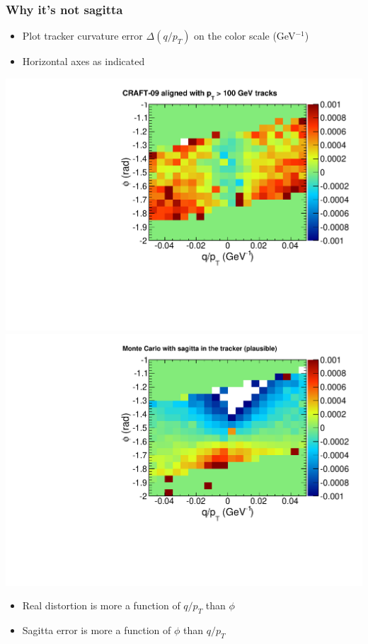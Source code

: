 \documentclass[compress]{beamer}
\begin{document}
\begin{frame}
\frametitle{Why it's not sagitta}

\begin{itemize}
\item Plot tracker curvature error $\Delta (q/p_T)$ on the color scale (GeV$^{-1}$)
\item Horizontal axes as indicated
\end{itemize}

\includegraphics[width=0.5\linewidth]{2d_real.pdf}
\includegraphics[width=0.5\linewidth]{2d_sagitta.pdf}

\begin{itemize}
\item Real distortion is more a function of $q/p_T$ than $\phi$
\item Sagitta error is more a function of $\phi$ than $q/p_T$
\end{itemize}

\end{frame}

\end{document}
